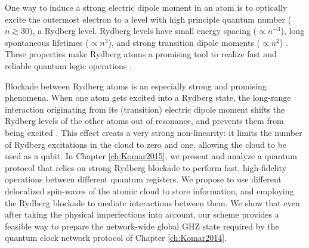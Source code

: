 One way to induce a strong electric dipole moment in an atom is to optically
excite the outermost electron to a level with high principle quantum number ($n
\gtrsim 30$), a Rydberg level. Rydberg levels have small energy spacing
($\propto n^{-3}$), long spontaneous lifetimes ($\propto n^3$), and strong
transition dipole moments ($\propto n^2$) \cite{Saffman2010}. These properties
make Rydberg atoms a promising tool to realize fast and reliable quantum
logic operations \cite{Lukin2001}.  

Blockade between Rydberg atoms is an especially strong and promising phenomena.
When one atom gets excited into a Rydberg state, the long-range interaction
originating from its (transition) electric dipole moment shifts the Rydberg
levels of the other atoms out of resonance, and prevents them from being excited
\cite{Urban2009}. This effect creats a very strong non-linearity: it
limits the number of Rydberg excitations in the cloud to zero and one, allowing
the cloud to be used as a qubit. In Chapter \ref{ch:Komar2015}, we present and
analyze a quantum protocol that relies on strong Rydberg blockade to perform
fast, high-fidelity operations between different quantum registers. We propose
to use different delocalized spin-waves of the atomic cloud to store
information, and employing the Rydberg blockade to mediate interactions between
them. We show that even after taking the physical imperfections into account,
our scheme provides a feasible way to prepare the network-wide global GHZ state
required by the quantum clock network protocol of Chapter \ref{ch:Komar2014}.

 









